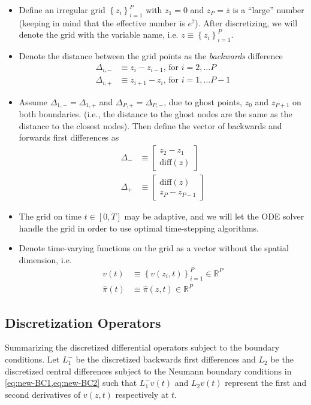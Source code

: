 \documentclass[11pt]{article}
\newcommand{\R}{\ensuremath{\mathbb{R}}}
\newcommand{\set}[1]{\ensuremath{\left\{{#1}\right\}}}
\begin{document}
\begin{itemize}
	\item Define an irregular  grid $\set{z_i}_{i=1}^P$ with $z_1 = 0$ and $z_P = \bar{z}$ is a ``large'' number (keeping in mind that the effective number is $e^{\bar{z}}$).  After discretizing, we will denote the grid with the variable name, i.e. $z \equiv \set{z_i}_{i=1}^P$.
	\item Denote the distance between the grid points as the \textit{backwards} difference
	\begin{align}
	\Delta_{i,-} &\equiv z_i - z_{i-1},\, \text{for } i = 2,\ldots P\\
	\Delta_{i,+} &\equiv z_{i+1} - z_i,\, \text{for } i = 1,\ldots P-1
	\end{align}
	\item Assume $\Delta_{1, -} = \Delta_{1, +}$ and $\Delta_{P, +} = \Delta_{P, -}$, due to ghost points, $z_0$ and $z_{P+1}$ on both boundaries. (i.e., the distance to the ghost nodes are the same as the distance to the closest nodes).  Then define the vector of backwards and forwards first differences as
	\begin{align}
	\Delta_{-} &\equiv \begin{bmatrix} z_2 - z_1 \\
	\text{diff}(z)
	\end{bmatrix}\\
	\Delta_{+} &\equiv \begin{bmatrix} \text{diff}(z)\\
	z_P - z_{P-1}
	\end{bmatrix}
	\end{align}
	\item The grid on time $t \in [0,T]$ may be adaptive, and we will let the ODE solver handle the grid in order to use optimal time-stepping algorithms.
	\item Denote time-varying functions on the grid as a vector without the spatial dimension, i.e. 
	\begin{align}
	v(t) &\equiv \set{v(z_i, t)}_{i=1}^P\in\R^P\\
	\hat{\pi}(t) &\equiv	\hat{\pi}(z,t) \in \R^P
	\end{align}
\end{itemize}

\subsection{Discretization Operators}\label{sec:discretization-operators}
Summarizing the discretized differential operators subject to the boundary conditions.  Let $L_1^{-}$ be the discretized backwards first differences and $L_2$ be the discretized central differences subject to the Neumann boundary conditions in \cref{eq:new-BC1,eq:new-BC2} such that $L_1^{-} v(t)$ and $L_2 v(t)$ represent the first and second derivatives of $v(z,t)$ respectively at $t$.
\end{document}
